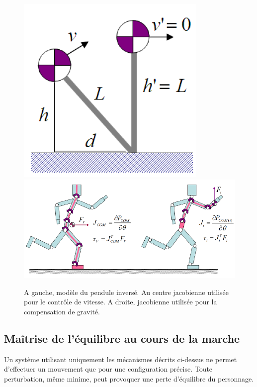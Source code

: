 \documentclass[runningheads,a4paper]{llncs}
\begin{document}
\vspace*{-0.4cm}
\begin{figure}[h]
\centering
\includegraphics[scale=0.5]{IPM.png}
\includegraphics[scale=0.5]{shema_jacobians.png}
\caption{A gauche, modèle du pendule inversé. Au centre jacobienne utilisée pour le contrôle de vitesse. A droite, jacobienne utilisée pour la compensation de gravité. \cite{coros2010generalized} }
\label{fig:ipm}
\label{fig:jacob}
\end{figure}

\vspace*{-0.5cm}
\subsection{Maîtrise de l'équilibre au cours de la marche}
\label{sec:previous_works_balance}

Un système utilisant uniquement les mécanismes décrits ci-dessus ne permet d'effectuer un mouvement que pour une configuration précise. Toute perturbation, même minime, peut provoquer une perte d'équilibre du personnage.
\end{document}
